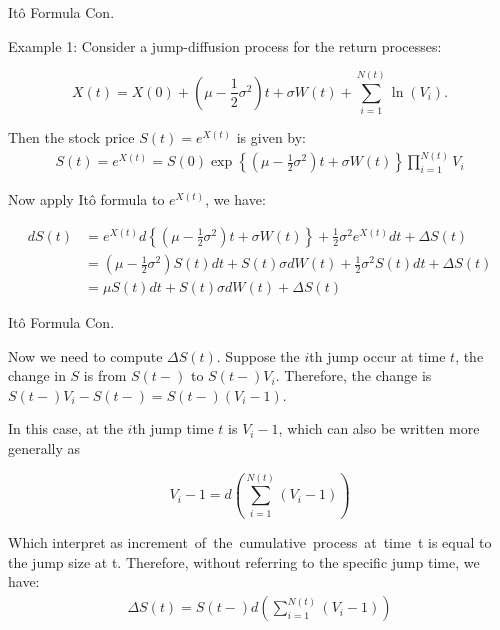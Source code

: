 \documentclass{beamer}
\begin{document}
 \begin{frame}{Itô Formula Con.}

    {\footnotesize \footnotesize
    \par Example 1: Consider a jump-diffusion process for the return processes:

    \[
    X(t) = X(0) + (\mu - \frac{1}{2} \sigma^2)t + \sigma W(t) + \sum_{i=1}^{N(t)} \ln(V_i).
    \]

    \par Then the stock price \( S(t) = e^{X(t)} \) is given by:
    \begin{align*}
        S(t) = e^{X(t)} = S(0) \exp \left\{ (\mu - \frac{1}{2} \sigma^2)t 
        + \sigma W(t) \right\} \prod_{i=1}^{N(t)} V_i
    \end{align*}
    \par  \pause Now apply Itô formula to \( e^{X(t)} \), we have:

    \[
    \begin{aligned}
    dS(t) &= e^{X(t)} d \left\{ (\mu - \frac{1}{2} \sigma^2)t + \sigma W(t) \right\} + \frac{1}{2} \sigma^2 e^{X(t)} dt + \Delta S(t) \\
    &= (\mu - \frac{1}{2} \sigma^2) S(t) dt + S(t) \sigma dW(t) + \frac{1}{2} \sigma^2 S(t) dt + \Delta S(t) \\
    &= \mu S(t) dt + S(t) \sigma dW(t) + \Delta S(t)
    \end{aligned}
    \]
    }
    
\end{frame}

 \begin{frame}{Itô Formula Con.}

    {\footnotesize \footnotesize
    \par Now we need to compute \(\Delta S(t)\). Suppose the \(i\)th jump occur at time \(t\), 
        the change in \(S\) is from \(S(t-)\) to \(S(t-)V_i\).
     Therefore, the change is \(S(t-)V_i - S(t-) = S(t-)(V_i - 1)\). 
     \par In this case, at the \(i\)th jump time \(t\) is \(V_i - 1\), which can also be written more generally as

    \[
    V_i - 1 = d \left( \sum_{i=1}^{N(t)} (V_i - 1) \right)
    \]
    \vspace{1em}
    \par \pause Which interpret as increment of the cumulative process at time t is equal to the jump size at t. 
    Therefore, without referring to the specific jump time, we have: 
    \begin{align*}
        \Delta S(t) = S(t-)d \left( \sum_{i=1}^{N(t)} (V_i - 1) \right)
    \end{align*}
    }
    
\end{frame}
\end{document}
